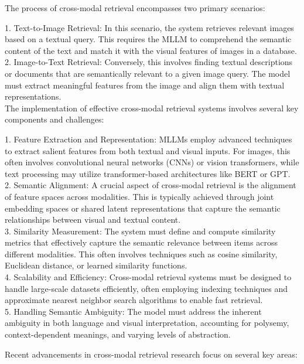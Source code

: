 The process of cross-modal retrieval encompasses two primary scenarios:

1. Text-to-Image Retrieval: In this scenario, the system retrieves relevant images based on a textual query. This requires the MLLM to comprehend the semantic content of the text and match it with the visual features of images in a database.
\\
2. Image-to-Text Retrieval: Conversely, this involves finding textual descriptions or documents that are semantically relevant to a given image query. The model must extract meaningful features from the image and align them with textual representations.
\\
The implementation of effective cross-modal retrieval systems involves several key components and challenges:

1. Feature Extraction and Representation: MLLMs employ advanced techniques to extract salient features from both textual and visual inputs. For images, this often involves convolutional neural networks (CNNs) or vision transformers, while text processing may utilize transformer-based architectures like BERT or GPT.
\\
2. Semantic Alignment: A crucial aspect of cross-modal retrieval is the alignment of feature spaces across modalities. This is typically achieved through joint embedding spaces or shared latent representations that capture the semantic relationships between visual and textual content.
\\
3. Similarity Measurement: The system must define and compute similarity metrics that effectively capture the semantic relevance between items across different modalities. This often involves techniques such as cosine similarity, Euclidean distance, or learned similarity functions.
\\
4. Scalability and Efficiency: Cross-modal retrieval systems must be designed to handle large-scale datasets efficiently, often employing indexing techniques and approximate nearest neighbor search algorithms to enable fast retrieval.
\\
5. Handling Semantic Ambiguity: The model must address the inherent ambiguity in both language and visual interpretation, accounting for polysemy, context-dependent meanings, and varying levels of abstraction.

Recent advancements in cross-modal retrieval research focus on several key areas:

